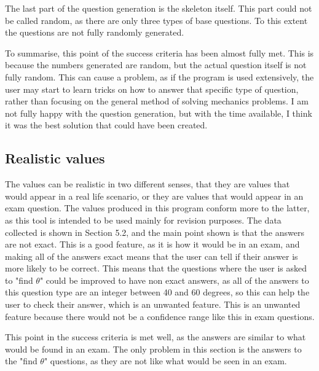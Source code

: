 The last part of the question generation is the skeleton itself. This part could not be called random, as there are only three types of base questions. To this extent the questions are not fully randomly generated.


To summarise, this point of the success criteria has been almost fully met. This is because the numbers generated are random, but the actual question itself is not fully random. This can cause a problem, as if the program is used extensively, the user may start to learn tricks on how to answer that specific type of question, rather than focusing on the general method of solving mechanics problems. I am not fully happy with the question generation, but with the time available, I think it was the best solution that could have been created.
\subsection{Realistic values}
 The values can be realistic in two different senses, that they are values that would appear in a real life scenario, or they are values that would appear in an exam question. The values produced in this program conform more to the latter, as this tool is intended to be used mainly for revision purposes. The data collected is shown in Section 5.2, and the main point shown is that the answers are not exact. This is a good feature, as it is how it would be in an exam, and making all of the answers exact means that the user can tell if their answer is more likely to be correct. This means that the questions where the user is asked to "find $\theta$" could be improved to have non exact answers, as all of the answers to this question type are an integer between 40 and 60 degrees, so this can help the user to check their answer, which is an unwanted feature. This is an unwanted feature because there would not be a confidence range like this in exam questions.
 
 This point in the success criteria is met well, as the answers are similar to what would be found in an exam. The only problem in this section is the answers to the "find $\theta$" questions, as they are not like what would be seen in an exam.
